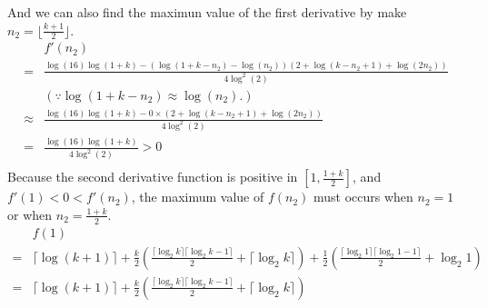 \documentclass[fleqn,a4paper,12pt]{article}
\begin{document}
\begin{enumerate}
\begin{itemize}
     And we can also find the maximun value of the first derivative by make $n_2 =  \lfloor \frac{k+1}{2} \rfloor$.\\    
     \begin{align*}
       &f'(n_2)\\
       = &\frac{ \log(16) \log(1+k)-( \log(1+k-n_2)- \log(n_2)) (2+ \log(k-n_2+1) + \log(2 n_2))}{4 \log^2(2)}\\       
       &(\because  \log(1+k-n_2) \approx  \log(n_2). )\\
       \approx&\frac{ \log(16) \log(1+k)- 0 \times (2+ \log(k - n_2 + 1)+ \log(2 n_2))}{4 \log^2(2)}\\
       =& \frac{ \log(16) \log(1+k)}{4 \log^2(2)} > 0 \\
     \end{align*}
     Because the second derivative function is positive in $[1,\frac{1+k}{2}]$, and $f'(1) < 0 < f'(n_2)$, the maximum value of $f(n_2)$ must occurs when $n_2=1$ or when $n_2=\frac{1+k}{2}$. \\
     \begin{align*}
       &f(1)\\
       =&  \lceil \log (k+1) \rceil + 
        \frac{k}{2} ( \frac{ \lceil \log_2 k \rceil \lceil \log_2 k - 1 \rceil  }{2} + \lceil \log_2 k \rceil )
          + \frac{1}{2} ( \frac{ \lceil \log_2 1 \rceil \lceil \log_2 1 - 1 \rceil  }{2} +  \log_2 1  ) \\
       =& \lceil \log (k+1) \rceil + \frac{k}{2} ( \frac{ \lceil \log_2 k \rceil \lceil \log_2 k - 1 \rceil }{2} + \lceil \log_2 k \rceil )
     \end{align*}


\end{itemize}
\end{enumerate}
\end{document}
